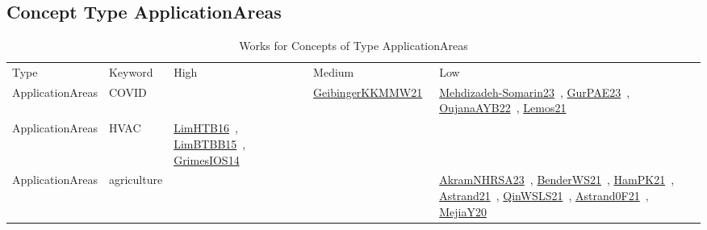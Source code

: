 \clearpage
\subsection{Concept Type ApplicationAreas}
\label{sec:ApplicationAreas}
{\scriptsize
\begin{longtable}{lp{3cm}>{\raggedright\arraybackslash}p{6cm}>{\raggedright\arraybackslash}p{6cm}>{\raggedright\arraybackslash}p{8cm}}
\rowcolor{white}\caption{Works for Concepts of Type ApplicationAreas}\\ \toprule
\rowcolor{white}Type & Keyword & High & Medium & Low\\ \midrule\endhead
\bottomrule
\endfoot
ApplicationAreas & COVID &  & \href{works/GeibingerKKMMW21.pdf}{GeibingerKKMMW21}~\cite{GeibingerKKMMW21} & \href{works/Mehdizadeh-Somarin23.pdf}{Mehdizadeh-Somarin23}~\cite{Mehdizadeh-Somarin23}, \href{works/GurPAE23.pdf}{GurPAE23}~\cite{GurPAE23}, \href{works/OujanaAYB22.pdf}{OujanaAYB22}~\cite{OujanaAYB22}, \href{works/Lemos21.pdf}{Lemos21}~\cite{Lemos21}\\
ApplicationAreas & HVAC & \href{works/LimHTB16.pdf}{LimHTB16}~\cite{LimHTB16}, \href{works/LimBTBB15.pdf}{LimBTBB15}~\cite{LimBTBB15}, \href{works/GrimesIOS14.pdf}{GrimesIOS14}~\cite{GrimesIOS14} &  & \\
ApplicationAreas & agriculture &  &  & \href{works/AkramNHRSA23.pdf}{AkramNHRSA23}~\cite{AkramNHRSA23}, \href{works/BenderWS21.pdf}{BenderWS21}~\cite{BenderWS21}, \href{works/HamPK21.pdf}{HamPK21}~\cite{HamPK21}, \href{works/Astrand21.pdf}{Astrand21}~\cite{Astrand21}, \href{works/QinWSLS21.pdf}{QinWSLS21}~\cite{QinWSLS21}, \href{works/Astrand0F21.pdf}{Astrand0F21}~\cite{Astrand0F21}, \href{works/MejiaY20.pdf}{MejiaY20}~\cite{MejiaY20}\\

\end{longtable}}
